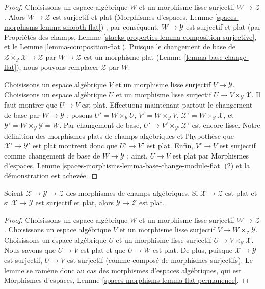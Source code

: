 \begin{proof}
Choisissons un espace algébrique $W$ et un morphisme lisse surjectif
$W \to \mathcal{Z}$. Alors $W \to \mathcal{Z}$ est surjectif et plat
(Morphismes d'espaces, Lemme \ref{spaces-morphisms-lemma-smooth-flat}) ;
par conséquent, $W \to \mathcal{Y}$ est surjectif et plat (par Propriétés des
champs, Lemme \ref{stacks-properties-lemma-composition-surjective}, et le
Lemme \ref{lemma-composition-flat}).
Puisque le changement de base de
$\mathcal{Z} \times_\mathcal{Y} \mathcal{X} \to \mathcal{Z}$
par $W \to \mathcal{Z}$ est un morphisme plat
(Lemme \ref{lemma-base-change-flat}), nous pouvons remplacer
$\mathcal{Z}$ par $W$.

\medskip\noindent
Choisissons un espace algébrique $V$ et un morphisme lisse surjectif
$V \to \mathcal{Y}$. Choisissons un espace algébrique $U$ et un morphisme
lisse surjectif $U \to V \times_\mathcal{Y} \mathcal{X}$.
Il faut montrer que $U \to V$ est plat. Effectuons maintenant partout le
changement de base par $W \to \mathcal{Y}$ : posons
$U' = W \times_\mathcal{Y} U$,
$V' = W \times_\mathcal{Y} V$,
$\mathcal{X}' = W \times_\mathcal{Y} \mathcal{X}$,
et $\mathcal{Y}' = W \times_\mathcal{Y} \mathcal{Y} = W$.
Par changement de base,
$U' \to V' \times_{\mathcal{Y}'} \mathcal{X}'$ est encore lisse.
Notre définition des morphismes plats de champs algébriques et l'hypothèse que
$\mathcal{X}' \to \mathcal{Y}'$ est plat montrent donc que
$U' \to V'$ est plat. Enfin, $V' \to V$ est surjectif comme changement de
base de $W \to \mathcal{Y}$ ; ainsi, $U \to V$ est plat par Morphismes
d'espaces, Lemme
\ref{spaces-morphisms-lemma-base-change-module-flat} (2)
et la démonstration est achevée.
\end{proof}

\begin{lemma}
\label{lemma-flat-permanence}
Soient $\mathcal{X} \to \mathcal{Y} \to \mathcal{Z}$ des morphismes de
champs algébriques. Si $\mathcal{X} \to \mathcal{Z}$ est plat et si
$\mathcal{X} \to \mathcal{Y}$ est surjectif et plat, alors
$\mathcal{Y} \to \mathcal{Z}$ est plat.
\end{lemma}

\begin{proof}
Choisissons un espace algébrique $W$ et un morphisme lisse surjectif
$W \to \mathcal{Z}$. Choisissons un espace algébrique $V$ et un morphisme
lisse surjectif $V \to W \times_\mathcal{Z} \mathcal{Y}$. Choisissons un
espace algébrique $U$ et un morphisme lisse surjectif
$U \to V \times_\mathcal{Y} \mathcal{X}$.
Nous savons que $U \to V$ est plat et que $U \to W$ est plat.
De plus, puisque $\mathcal{X} \to \mathcal{Y}$ est surjectif,
$U \to V$ est surjectif (comme composé de morphismes surjectifs).
Le lemme se ramène donc au cas des morphismes d'espaces algébriques, qui est
Morphismes d'espaces, Lemme
\ref{spaces-morphisms-lemma-flat-permanence}.
\end{proof}

